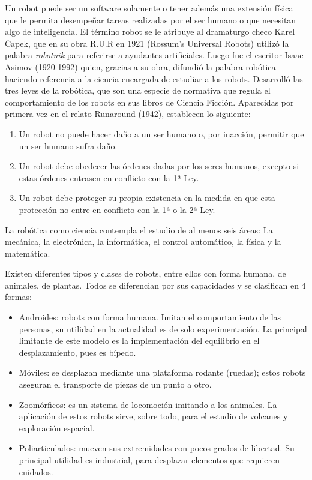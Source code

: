 Un robot puede ser un software solamente o tener además una extensión física que le permita desempeñar tareas realizadas por el ser humano o que necesitan algo de inteligencia. El término robot se le atribuye al dramaturgo checo Karel Čapek, que en su obra R.U.R en 1921 (Rossum’s Universal Robots) utilizó la palabra \textit{robotnik} para referirse a ayudantes artificiales. Luego fue el escritor Isaac Asimov (1920-1992) quien,  gracias a su obra, difundió la palabra robótica haciendo referencia a la ciencia encargada de estudiar a los robots. Desarrolló las tres leyes de la robótica, que son una especie de normativa que regula el comportamiento de los robots en sus libros de Ciencia Ficción. Aparecidas por primera vez en el relato Runaround (1942), establecen lo siguiente:

\begin{enumerate}
\item Un robot no puede hacer daño a un ser humano o, por inacción, permitir que un ser humano sufra daño.
\item Un robot debe obedecer las órdenes dadas por los seres humanos, excepto si estas órdenes entrasen en conflicto con la 1ª Ley.
\item Un robot debe proteger su propia existencia en la medida en que esta protección no entre en conflicto con la 1ª o la 2ª Ley.
\end{enumerate}
La robótica como ciencia contempla el estudio de al menos seis áreas: La mecánica, la electrónica, la informática, el control automático, la física y la matemática.

Existen diferentes tipos y clases de robots, entre ellos con forma humana, de animales, de plantas. Todos se diferencian por sus capacidades y se clasifican en 4 formas:\begin{itemize}
\item Androides: robots con forma humana. Imitan el comportamiento de las personas, su utilidad en la actualidad es de solo experimentación. La principal limitante de este modelo es la implementación del equilibrio en el desplazamiento, pues es bípedo.
\item Móviles: se desplazan mediante una plataforma rodante (ruedas); estos robots aseguran el transporte de piezas de un punto a otro.
\item Zoomórficos: es un sistema de locomoción imitando a los animales. La aplicación de estos robots sirve, sobre todo, para el estudio de volcanes y exploración espacial.
\item Poliarticulados: mueven sus extremidades con pocos grados de libertad. Su principal utilidad es industrial, para desplazar elementos que requieren cuidados.
\end{itemize}

